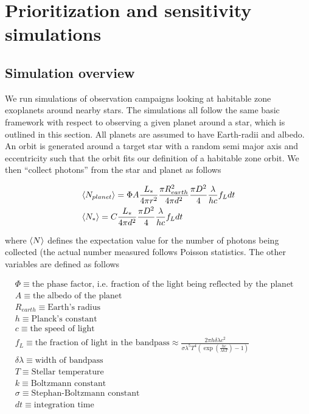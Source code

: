 \documentclass{article}
\begin{document}
	\section{Prioritization and sensitivity simulations}
	\subsection{Simulation overview}
	
	We run simulations of observation campaigns looking at habitable zone exoplanets around nearby stars. The simulations all follow the same basic framework with respect to observing a given planet around a star, which is outlined in this section. All planets are assumed to have Earth-radii and albedo. An orbit is generated around a target star with a random semi major axis and eccentricity such that the orbit fits our definition of a habitable zone orbit. 
	We then ``collect photons'' from the star and planet as follows
	
	\begin{align}
	&\braket{N_{planet}} = \Phi A \frac{L_{*}}{4 \pi r^2} \frac{\pi R_{earth}^2}{4 \pi d^2} \frac{\pi D^2}{4} \frac{\lambda}{h c} f_L dt \\
	&\braket{N_{*}} = C \frac{L_{*}}{4 \pi d^2} \frac{\pi D^2}{4} \frac{\lambda}{h c} f_L dt
	\end{align}
	
where $\braket{N}$ defines the expectation value for the number of photons being collected (the actual number measured follows Poisson statistics. The other variables are defined as follows
	
	\begin{align*}
	&\Phi \equiv \mbox{the phase factor, i.e. fraction of the light being reflected by the planet towards observer} \\
	&A \equiv \mbox{the albedo of the planet} \\ 
	&R_{earth} \equiv \mbox{Earth's radius} \\
	&h \equiv \mbox{Planck's constant} \\ 
	&c \equiv \mbox{the speed of light} \\
	&f_L \equiv \mbox{the fraction of light in the bandpass} \approx \frac{2 \pi h \delta \lambda c^2}{\sigma \lambda^5 T^4 \left( \exp{\left( \frac{h c}{\lambda k T} \right)} - 1  \right)} \\
	&\delta \lambda \equiv \mbox{width of bandpass} \\
	&T \equiv \mbox{Stellar temperature} \\
	&k \equiv \mbox{Boltzmann constant}\\
	&\sigma \equiv \mbox{Stephan-Boltzmann constant} \\
	&dt \equiv \mbox{integration time}
	\end{align*}
	
\end{document}
